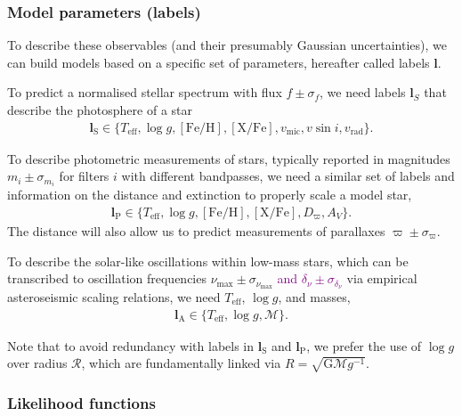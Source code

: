 \documentclass[
  journal=pasa,
  manuscript=research-paper, %
  year=2021,
  volume=37,
]{cup-journal}
\newcommand{\SB}[1]{{\textcolor{purple}{#1}}}
\newcommand{\Teff}{$T_\mathrm{eff}$\xspace}
\newcommand{\logg}{$\log g$\xspace}
\begin{document}
\subsubsection{Model parameters (labels)} \label{subsubsec:labels}

To describe these observables (and their presumably Gaussian uncertainties), we can build models based on a specific set of parameters, hereafter called labels $\boldsymbol{l}$.

To predict a normalised stellar spectrum with flux $f \pm \sigma_f$, we need labels $\boldsymbol{l}_S$ that describe the photosphere of a star
\begin{align}
    \boldsymbol{l}_\text{S} \in \{
    T_\text{eff}, \log g, \mathrm{[Fe/H]}, \mathrm{[X/Fe]}, v_\mathrm{mic}, v \sin i, v_\text{rad}
    \}.
\end{align}

To describe photometric measurements of stars, typically reported in magnitudes $m_i \pm \sigma_{m_i}$ for filters $i$ with different bandpasses, we need a similar set of labels and information on the distance and extinction to properly scale a model star,
\begin{align}
    \boldsymbol{l}_\text{P} \in \{ T_\text{eff}, \log g, \mathrm{[Fe/H]}, \mathrm{[X/Fe]}, D_\varpi, A_V \}.
\end{align}
The distance will also allow us to predict measurements of parallaxes $\varpi \pm \sigma_\varpi$.

To describe the solar-like oscillations within low-mass stars, which can be transcribed to oscillation frequencies $\nu_\text{max} \pm \sigma_{\nu_\text{max}}$ \SB{and $\delta_\nu \pm \sigma_{\delta_\nu}$} via empirical asteroseismic scaling relations, we need \Teff, \logg, and masses,
\begin{align}
    \boldsymbol{l}_\text{A} \in \{ T_\text{eff}, \log g, \mathcal{M} \}.
\end{align}

Note that to avoid redundancy with labels in $\boldsymbol{l}_\text{S}$ and $\boldsymbol{l}_\text{P}$, we prefer the use of \logg over radius $\mathcal{R}$, which are fundamentally linked via $R = \sqrt{\mathrm{G} \mathcal{M} g^{-1}}$.

\subsubsection{Likelihood functions} \label{subsubsec:likelihood}
\end{document}
